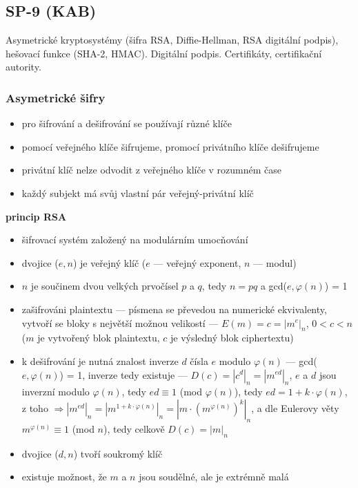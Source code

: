 \subsection{SP-9 (KAB)}
Asymetrické kryptosystémy (šifra RSA, Diffie-Hellman, RSA digitální podpis), hešovací funkce (SHA-2, HMAC). Digitální podpis. Certifikáty, certifikační autority.

\subsubsection*{Asymetrické šifry}
\begin{itemize}
	\item pro šifrování a dešifrování se používají různé klíče
	\item pomocí veřejného klíče šifrujeme, promocí privátního klíče dešifrujeme
	\item privátní klíč nelze odvodit z veřejného klíče v rozumném čase
	\item každý subjekt má svůj vlastní pár veřejný-privátní klíč
\end{itemize}
\textbf{princip RSA}
\begin{itemize}
	\item šifrovací systém založený na modulárním umocňování
	\item dvojice ($e, n$) je veřejný klíč ($e$ --- veřejný exponent, $n$ --- modul)
	\item $n$ je součinem dvou velkých prvočísel $p$ a $q$, tedy $n = pq$ a gcd($e, \varphi(n)$) = 1
	\item zašifrováni plaintextu --- písmena se převedou na numerické ekvivalenty, vytvoří se bloky s největší možnou velikostí --- $E(m) = c = |m^e|_n$, $0 < c < n$ ($m$ je vytvořený blok plaintextu, $c$ je výsledný blok ciphertextu)
	\item k dešifrování je nutná znalost inverze $d$ čísla $e$ modulo $\varphi(n)$ --- gcd($e, \varphi(n)$) = 1, inverze tedy existuje --- $D(c) = |c^d|_n = |m^{ed}|_n$, $e$ a $d$ jsou inverzní modulo $\varphi(n)$, tedy $ed \equiv 1$ (mod $\varphi(n)$), tedy $ed = 1 + k \cdot \varphi(n)$, z toho $\Rightarrow |m^{ed}|_n = |m^{1 + k \cdot \varphi(n)}|_n = |m \cdot (m^{\varphi(n)})^{k}|_n$, a dle Eulerovy věty $m^{\varphi(n)} \equiv 1$ (mod $n$), tedy celkově $D(c) = |m|_n$
	
	\item dvojice ($d, n$) tvoří soukromý klíč 
	
	\item existuje možnost, že $m$ a $n$ jsou soudělné, ale je extrémně malá
\end{itemize}

